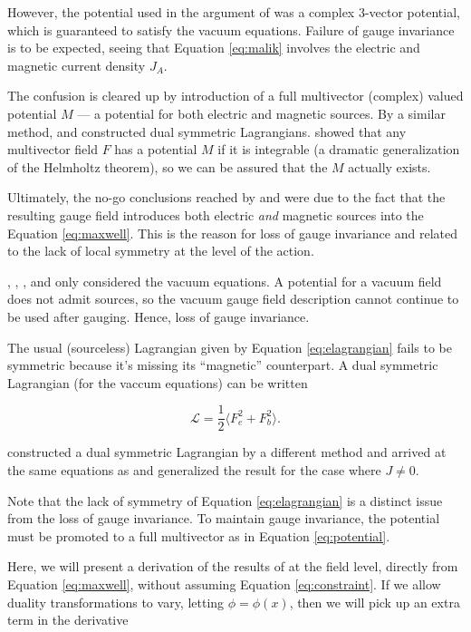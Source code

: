 \documentclass{article}
\begin{document}
  However, the potential used in the argument of \cite{saa} was a complex 3-vector potential, which is guaranteed to satisfy the vacuum equations. Failure of gauge invariance is to be expected, seeing that Equation \ref{eq:malik} involves the electric and magnetic current density $J_A$.

  The confusion is cleared up by introduction of a full multivector (complex) valued potential $M$ --- a potential for both electric and magnetic sources. By a similar method, \cite{dressel} and \cite{vasconcellos} constructed dual symmetric Lagrangians. \cite{cagc} showed that any multivector field $F$ has a potential $M$ if it is integrable (a dramatic generalization of the Helmholtz theorem), so we can be assured that the $M$ actually exists.

  Ultimately, the no-go conclusions reached by \cite{bunster} and \cite{deser} were due to the fact that the resulting gauge field introduces both electric \emph{and} magnetic sources into the Equation \ref{eq:maxwell}. This is the reason for loss of gauge invariance and related to the lack of local symmetry at the level of the action. 

  \cite{saa}, \cite{malik}, \cite{bunster}, and \cite{deser} only considered the vacuum equations. A potential for a vacuum field does not admit sources, so the vacuum gauge field description cannot continue to be used after gauging. Hence, loss of gauge invariance. 

  The usual (sourceless) Lagrangian given by Equation \ref{eq:elagrangian} fails to be symmetric because it's missing its ``magnetic'' counterpart. A dual symmetric Lagrangian (for the vaccum equations) can be written\cite{dressel}

  \begin{equation}
    \mathcal{L} = \frac{1}{2}\langle F_e^2 + F_b^2 \rangle.
  \end{equation}

  \cite{tiwari} constructed a dual symmetric Lagrangian by a different method and arrived at the same equations as \cite{malik} and generalized the result for the case where $J \not= 0$.

  Note that the lack of symmetry of Equation \ref{eq:elagrangian} is a distinct issue from the loss of gauge invariance. To maintain gauge invariance, the potential must be promoted to a full multivector as in Equation \ref{eq:potential}.

  Here, we will present a derivation of the results of \cite{tiwari} at the field level, directly from Equation \ref{eq:maxwell}, without assuming Equation \ref{eq:constraint}. If we allow duality transformations to vary, letting $\phi = \phi(x)$, then we will pick up an extra term in the derivative
\end{document}
